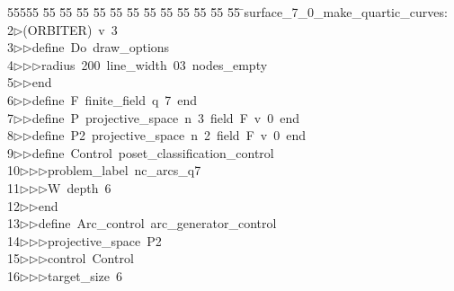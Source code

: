 %
%
\begin{tabbing}
55555 \= 55 \= 55 \= 55 \= 55 \= 55 \= 55 \= 55 \= 55 \= 55 \= 55 \= 55 \= 55 \= \>surface\_7\_0\_make\_quartic\_curves:\\[0pt]
2\>$\triangleright$\>(ORBITER)\ v\ 3\ \\[0pt]
3\>$\triangleright$\>$\triangleright$\>define\ Do\ draw\_options\ \\[0pt]
4\>$\triangleright$\>$\triangleright$\>$\triangleright$\>radius\ 200\ line\_width\ 03\ nodes\_empty\ \\[0pt]
5\>$\triangleright$\>$\triangleright$\>end\ \\[0pt]
6\>$\triangleright$\>$\triangleright$\>define\ F\ finite\_field\ q\ 7\ end\ \\[0pt]
7\>$\triangleright$\>$\triangleright$\>define\ P\ projective\_space\ n\ 3\ field\ F\ v\ 0\ end\ \\[0pt]
8\>$\triangleright$\>$\triangleright$\>define\ P2\ projective\_space\ n\ 2\ field\ F\ v\ 0\ end\ \\[0pt]
9\>$\triangleright$\>$\triangleright$\>define\ Control\ poset\_classification\_control\ \\[0pt]
10\>$\triangleright$\>$\triangleright$\>$\triangleright$\>problem\_label\ nc\_arcs\_q7\ \\[0pt]
11\>$\triangleright$\>$\triangleright$\>$\triangleright$\>W\ depth\ 6\ \\[0pt]
12\>$\triangleright$\>$\triangleright$\>end\ \\[0pt]
13\>$\triangleright$\>$\triangleright$\>define\ Arc\_control\ arc\_generator\_control\ \\[0pt]
14\>$\triangleright$\>$\triangleright$\>$\triangleright$\>projective\_space\ P2\ \\[0pt]
15\>$\triangleright$\>$\triangleright$\>$\triangleright$\>control\ Control\ \\[0pt]
16\>$\triangleright$\>$\triangleright$\>$\triangleright$\>target\_size\ 6\ \\[0pt]

\end{tabbing}
